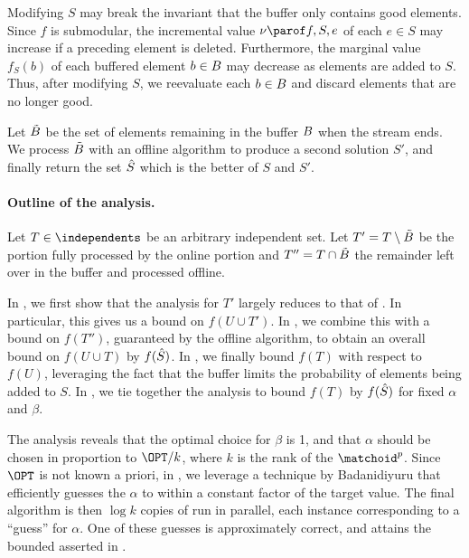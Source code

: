 \documentclass[oneside,letterpaper]{scrartcl} \usepackage{macros}
\newcommand{\mindex}{\ell}
\newcommand{\pmatchoid}{\matchoid^p} \newcommand{\defpmatchoid}{\pmatchoid = (\groundset,\independents)} \newcommand{\matroidI}{\matroid_{\mindex}} \newcommand{\groundsetI}{\groundset_{\mindex}} \newcommand{\independentsI}{\independents_{\mindex}} \newcommand{\defmatroidI}{\matroidI = (\groundsetI,\independentsI)} \newcommand{\offlineratio}{\gamma_p} \newcommand{\optset}{T^*}
\begin{document}
Modifying $S$ may break the invariant that the buffer only contains
good elements. Since $f$ is submodular, the incremental value
$\incvalueof{f}{S}{e}$ of each $e \in S$ may increase if a preceding
element is deleted. Furthermore, the marginal value $f_S(b)$ of each
buffered element $b \in B$ may decrease as elements are added to
$S$. Thus, after modifying $S$, we reevaluate each $b \in B$ and
discard elements that are no longer good.


Let $\tilde{B}$ be the set of elements remaining in the buffer
$B$ when the stream ends.  We process $\tilde{B}$ with an
offline algorithm to produce a second solution $S'$, and finally
return the set $\hat{S}$ which is the better of $S$ and $S'$.

\paragraph{Outline of the analysis.}

Let $T \in \independents$ be an arbitrary independent set. Let $T' = T
\setminus \tilde{B}$ be the portion fully processed by the online
portion and $T'' = T \cap \tilde{B}$ the remainder left over in the
buffer and processed offline.

In , we first show that the
analysis for $T'$ largely reduces to that of
. In particular, this gives us a bound on
$f(U \cup T')$. In , we combine this
with a bound on $f(T'')$, guaranteed by the offline algorithm, to
obtain an overall bound on $f(U \cup T)$ by $f(\hat{S})$. In
, we finally bound
$f(T)$ with respect to $f(U)$, leveraging the fact that the buffer
limits the probability of elements being added to $S$. In
, we tie together the analysis to
bound $f(T)$ by $f(\hat{S})$ for fixed $\alpha$ and $\beta$.

The analysis reveals that the optimal choice for $\beta$ is 1, and
that $\alpha$ should be chosen in proportion to $\OPT/k$, where $k$ is
the rank of the $\pmatchoid$. Since $\OPT$ is not known a priori, in
, we leverage a technique by
Badanidiyuru \etal \cite{bmkk-sso-14} that efficiently guesses the
$\alpha$ to within a constant factor of the target value. The final
algorithm is then $\log k$ copies of
 run in parallel, each instance
corresponding to a ``guess'' for $\alpha$. One of these guesses is
approximately correct, and attains the bounded asserted in
.
\end{document}
